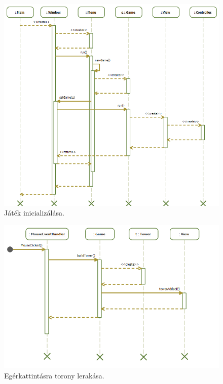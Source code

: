 \begin{figure}[H]
\begin{center}
\includegraphics[width=18cm]{images/grafikaSeq/init.png}
\caption{Játék inicializálása.}
\label{fig:Graphic_initialize}
\end{center}
\end{figure}

\begin{figure}[H]
\begin{center}
\includegraphics[width=18cm]{images/grafikaSeq/mouseTower.png}
\caption{Egérkattintásra torony lerakása.}
\label{fig:Graphic_mouse_tower}
\end{center}
\end{figure}

